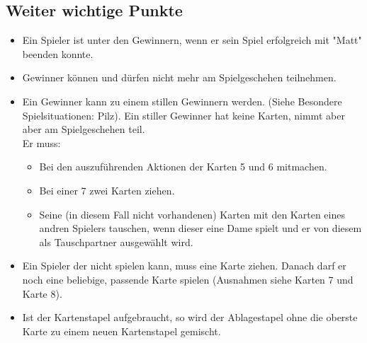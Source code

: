 \documentclass{article}
\begin{document}
\subsection*{Weiter wichtige Punkte}
\begin{itemize}

\item Ein Spieler ist unter den Gewinnern, wenn er sein Spiel erfolgreich mit "Matt" beenden konnte.

\item Gewinner können und dürfen nicht mehr am Spielgeschehen teilnehmen.

\item Ein Gewinner kann zu einem stillen Gewinnern werden. (Siehe Besondere Spielsituationen: Pilz). Ein stiller Gewinner hat keine Karten, nimmt aber aber am Spielgeschehen teil. \\

Er muss: \\
\begin{itemize}

\item Bei den auszuführenden Aktionen der Karten 5 und 6 mitmachen.

\item Bei einer 7 zwei Karten ziehen.

\item Seine (in diesem Fall nicht vorhandenen) Karten mit den Karten eines andren Spielers tauschen, wenn dieser eine Dame spielt und er von diesem als Tauschpartner ausgewählt wird.
\end{itemize}

\item Ein Spieler der nicht spielen kann, muss eine Karte ziehen. Danach darf er noch eine beliebige, passende Karte spielen (Ausnahmen siehe Karten 7 und Karte 8).

\item Ist der Kartenstapel aufgebraucht, so wird der Ablagestapel ohne die oberste Karte zu einem neuen Kartenstapel gemischt.
\end{itemize}
\end{document}
